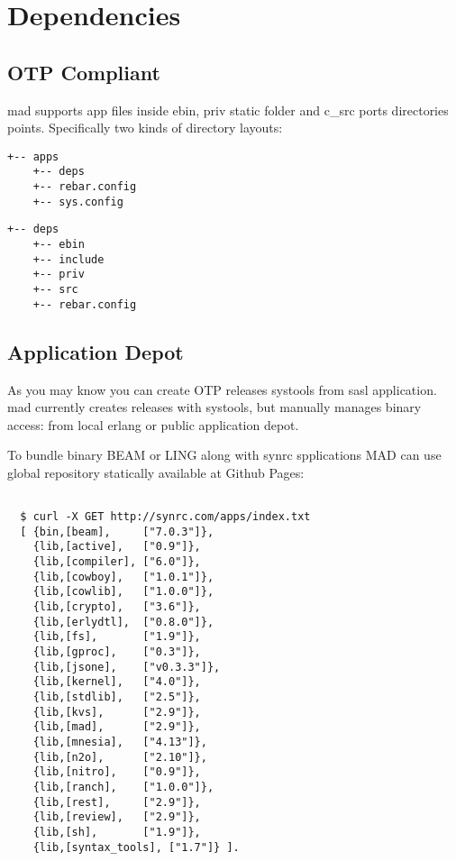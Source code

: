 \section{Dependencies}

\subsection{OTP Compliant}

mad supports app files inside ebin, priv static folder and c_src ports directories points.
Specifically two kinds of directory layouts:

\vspace{1\baselineskip}
\begin{lstlisting}[caption=Solution]
    +-- apps
    +-- deps
    +-- rebar.config
    +-- sys.config
\end{lstlisting}
\vspace{1\baselineskip}

\vspace{1\baselineskip}
\begin{lstlisting}[caption=OTP Application]
    +-- deps
    +-- ebin
    +-- include
    +-- priv
    +-- src
    +-- rebar.config
\end{lstlisting}
\vspace{1\baselineskip}

\subsection{Application Depot}

As you may know you can create OTP releases systools from sasl application.
mad currently creates releases with systools, but manually manages binary access:
from local erlang or public application depot.

To bundle binary BEAM or LING along with synrc spplications MAD can use
global repository statically available at Github Pages:

\vspace{1\baselineskip}
\begin{lstlisting}

  $ curl -X GET http://synrc.com/apps/index.txt
  [ {bin,[beam],     ["7.0.3"]},
    {lib,[active],   ["0.9"]},
    {lib,[compiler], ["6.0"]},
    {lib,[cowboy],   ["1.0.1"]},
    {lib,[cowlib],   ["1.0.0"]},
    {lib,[crypto],   ["3.6"]},
    {lib,[erlydtl],  ["0.8.0"]},
    {lib,[fs],       ["1.9"]},
    {lib,[gproc],    ["0.3"]},
    {lib,[jsone],    ["v0.3.3"]},
    {lib,[kernel],   ["4.0"]},
    {lib,[stdlib],   ["2.5"]},
    {lib,[kvs],      ["2.9"]},
    {lib,[mad],      ["2.9"]},
    {lib,[mnesia],   ["4.13"]},
    {lib,[n2o],      ["2.10"]},
    {lib,[nitro],    ["0.9"]},
    {lib,[ranch],    ["1.0.0"]},
    {lib,[rest],     ["2.9"]},
    {lib,[review],   ["2.9"]},
    {lib,[sh],       ["1.9"]},
    {lib,[syntax_tools], ["1.7"]} ].

\end{lstlisting}
\vspace{1\baselineskip}
